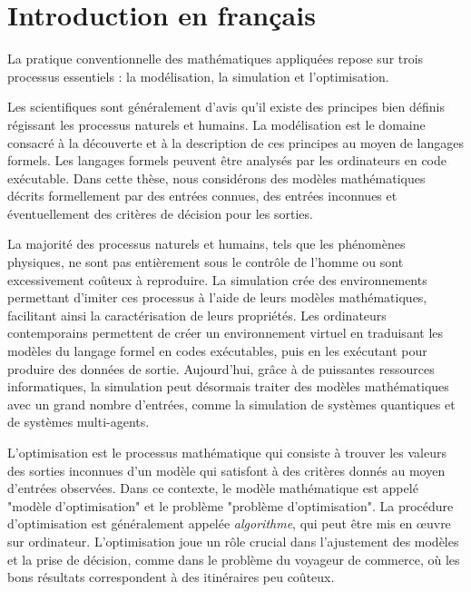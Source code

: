 
\chapter{Introduction en français}  %


La pratique conventionnelle des mathématiques appliquées repose sur trois processus essentiels : la modélisation, la simulation et l'optimisation.

Les scientifiques sont généralement d'avis qu'il existe des principes bien définis régissant les processus naturels et humains. La modélisation est le domaine consacré à la découverte et à la description de ces principes au moyen de langages formels. Les langages formels peuvent être analysés par les ordinateurs en code exécutable. Dans cette thèse, nous considérons 
des modèles mathématiques décrits formellement par des entrées connues, des entrées inconnues et éventuellement des critères de décision pour les sorties.  

La majorité des processus naturels et humains, tels que les phénomènes physiques, ne sont pas entièrement sous le contrôle de l'homme ou sont excessivement coûteux à reproduire. La simulation crée des environnements permettant d'imiter ces processus à l'aide de leurs modèles mathématiques, facilitant ainsi la caractérisation de leurs propriétés. Les ordinateurs contemporains permettent de créer un environnement virtuel en traduisant les modèles du langage formel en codes exécutables, puis en les exécutant pour produire des données de sortie.  Aujourd'hui, grâce à de puissantes ressources informatiques, la simulation peut désormais traiter des modèles mathématiques avec un grand nombre d'entrées, comme la simulation de systèmes quantiques et de systèmes multi-agents.


L'optimisation est le processus mathématique qui consiste à trouver les valeurs des sorties inconnues d'un modèle qui satisfont à des critères donnés au moyen d'entrées observées. Dans ce contexte, le modèle mathématique est appelé "modèle d'optimisation" et le problème "problème d'optimisation". La procédure d'optimisation est généralement appelée \emph{algorithme}, qui peut être mis en œuvre sur ordinateur. L'optimisation joue un rôle crucial dans l'ajustement des modèles et la prise de décision, comme dans le problème du voyageur de commerce, où les bons résultats correspondent à des itinéraires peu coûteux.

